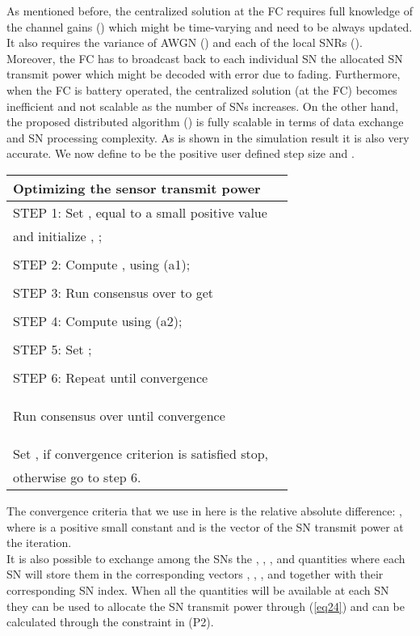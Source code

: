 \documentclass[conference]{IEEEtran}
\begin{document}
As mentioned before, the centralized solution at the FC requires full knowledge of the channel gains () which might be time-varying and need to be  always updated. It also requires the variance of AWGN () and each of the local SNRs (). Moreover, the FC has to broadcast back to each individual SN the allocated SN transmit power which might be decoded with error due to fading. Furthermore, when the FC is battery operated, the centralized solution (at the FC) becomes inefficient and not scalable as the number of SNs increases. On the other hand, the proposed distributed algorithm () is fully scalable in terms of data exchange and SN processing complexity. As is shown in the simulation result it is also very accurate.
We now define  to be the positive user defined step size and .
\begin{table}[htp!] 
\small
\centering \begin{tabular}{l r} \hline\hline  Optimizing the sensor transmit power \\ [0.6ex] 
\hline STEP 1:  Set ,  equal to a small positive value  \\  \hspace{1.2cm} and initialize , ;\\  \\ STEP 2:  Compute  ,   using (a1);\\  \\
STEP 3:  Run consensus over  to get \\ \\ 
STEP 4:  Compute  using (a2);\\ \\
STEP 5:  Set ;\\ \\
STEP 6:  Repeat until convergence  \\ \\  \hspace{-2.4cm}\\ \\ Run consensus over  until convergence \\ \\ \hspace{0.6cm}  \\ \\ Set , if convergence criterion is satisfied stop, \\  otherwise go to step 6. \\ [0.5ex]  \hline \end{tabular} 
\label{tab:hresult} 
\end{table} 
The convergence criteria that we use in here is the relative absolute difference: , where  is a positive small constant and  is the vector of the SN transmit power at the  iteration.\\
 \indent It is also possible to exchange among the SNs the , , , and  quantities  where each SN will store them  in the corresponding vectors , , , and  together with their corresponding SN index. When all the quantities will be available at each SN they can be used to allocate the SN transmit power through (\ref{eq24}) and  can be calculated through the constraint in (P2). 
\end{document}
